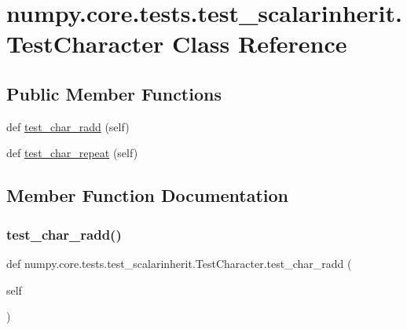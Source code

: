 \hypertarget{classnumpy_1_1core_1_1tests_1_1test__scalarinherit_1_1TestCharacter}{}\section{numpy.\+core.\+tests.\+test\+\_\+scalarinherit.\+Test\+Character Class Reference}
\label{classnumpy_1_1core_1_1tests_1_1test__scalarinherit_1_1TestCharacter}
\subsection*{Public Member Functions}
\begin{DoxyCompactItemize}
\item 
def \hyperlink{classnumpy_1_1core_1_1tests_1_1test__scalarinherit_1_1TestCharacter_af5fb16c73f900ddac3363784f3f58032}{test\+\_\+char\+\_\+radd} (self)
\item 
def \hyperlink{classnumpy_1_1core_1_1tests_1_1test__scalarinherit_1_1TestCharacter_ae192509f429d9a387b0bcacb56de7f4f}{test\+\_\+char\+\_\+repeat} (self)
\end{DoxyCompactItemize}


\subsection{Member Function Documentation}
\mbox{\label{classnumpy_1_1core_1_1tests_1_1test__scalarinherit_1_1TestCharacter_af5fb16c73f900ddac3363784f3f58032}} 
\subsubsection{\texorpdfstring{test\+\_\+char\+\_\+radd()}{test\_char\_radd()}}
{\footnotesize\ttfamily def numpy.\+core.\+tests.\+test\+\_\+scalarinherit.\+Test\+Character.\+test\+\_\+char\+\_\+radd (\begin{DoxyParamCaption}\item[{}]{self }\end{DoxyParamCaption})}

